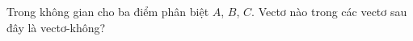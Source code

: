 \begin{ex}
Trong không gian cho ba điểm phân biệt $A$, $B$, $C$. Vectơ nào trong các vectơ sau đây là vectơ-không?
\end{ex}
